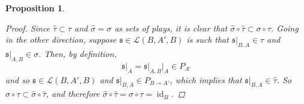 \documentclass[11pt]{article} %
\theoremstyle{plain} %
\newtheorem{proposition}[theorem]{Proposition}
\theoremstyle{definition} %
\theoremstyle{exercisestyle}
\DeclareMathOperator{\id}{id}
\renewcommand{\implies}{\multimap}
\newcommand{\comp}[2]{#1 \circ #2}
\renewcommand{\L}{\mathcal L}
\newcommand{\s}{\mathfrak{s}}
\begin{document}
\begin{proposition}
\begin{proof}
      Since $\hat\tau\subset\tau$ and $\hat\sigma=\sigma$ as sets of plays, it is clear that $\comp{\hat\sigma}{\hat\tau}\subset\comp\sigma\tau$.  Going in the other direction, suppose $\s\in\L(B,A',B)$ is such that $\s\vert_{B,A}\in\tau$ and $\s\vert_{A,B}\in\sigma$.  Then, by definition,
      \[
        \s\vert_A=\s\vert_{A,B}\vert_A\in P_{A'}
        \]
      and so $\s\in\L(B,A',B)$ and $\s\vert_{B,A}\in P_{B\implies A'}$, which implies that $\s\vert_{B,A}\in\hat\tau$.  So $\comp\sigma\tau\subset\comp{\hat\sigma}{\hat\tau}$, and therefore $\comp{\hat\sigma}{\hat\tau}=\comp\sigma\tau=\id_B$.  
    \end{proof}
\end{proposition}
\end{document}
